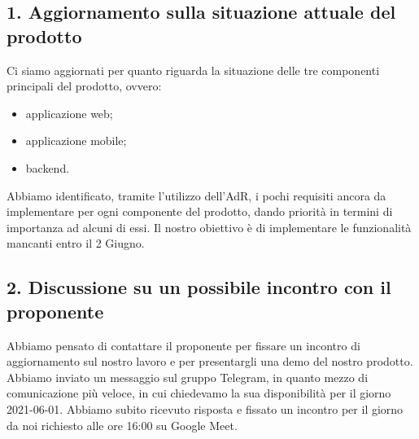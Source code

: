 \subsection*{\hypertarget{link1}{1. Aggiornamento sulla situazione attuale del prodotto}}
Ci siamo aggiornati per quanto riguarda la situazione delle tre componenti principali del prodotto, ovvero:
\begin{itemize}
	\item applicazione web;
	\item applicazione mobile;
	\item backend.
\end{itemize}
Abbiamo identificato, tramite l'utilizzo dell'AdR, i pochi requisiti ancora da implementare per ogni componente del prodotto, dando priorità in termini di importanza ad alcuni di essi.
Il nostro obiettivo è di implementare le funzionalità mancanti entro il 2 Giugno.
\subsection*{\hypertarget{link2}{2. Discussione su un possibile incontro con il proponente}}
Abbiamo pensato di contattare il proponente per fissare un incontro di aggiornamento sul nostro lavoro e per presentargli una demo del nostro prodotto.
Abbiamo inviato un messaggio sul gruppo Telegram, in quanto mezzo di comunicazione più veloce, in cui chiedevamo la sua disponibilità per il giorno 2021-06-01.
Abbiamo subito ricevuto risposta e fissato un incontro per il giorno da noi richiesto alle ore 16:00 su Google Meet.

